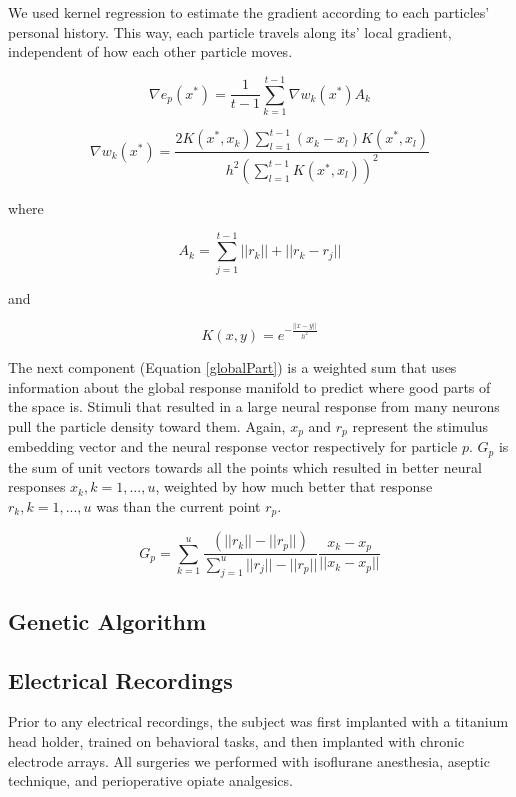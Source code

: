 We used kernel regression to estimate the gradient according to each particles’ personal history. This way, each particle travels along its' local gradient, independent of how each other particle moves. 

\begin{equation}
\nabla e_p (x^* )=\frac{1}{t-1} \sum_{k=1}^{t-1} \nabla w_k (x^* )  A_k
\end{equation}

\begin{equation}
\nabla w_k (x^* )=\frac{2K(x^*,x_k) \sum_{l=1}^{t-1} (x_k-x_l)K(x^*,x_l)} {h^2\left(\sum_{l=1}^{t-1}K(x^*, x_l)\right)^2}
\end{equation}

where

\begin{equation}
A_k = \sum_{j=1}^{t-1}||r_k||+||r_k-r_j||
\end{equation}

and

\begin{equation}
K(x,y)=e^{- \frac{||x-y||}{h^2}}
\end{equation}

The next component (Equation \ref{globalPart}) is a weighted sum that uses information about the global response manifold to predict where good parts of the space is. Stimuli that resulted in a large neural response from many neurons pull the particle density toward them. Again, $x_p$ and $r_p$ represent the stimulus embedding vector and the neural response vector respectively for particle $p$. $G_p$ is the sum of unit vectors towards all the points which resulted in better neural responses $x_k, k = 1,...,u$, weighted by how much better that response $r_k, k = 1,...,u$ was than the current point $r_p$.

\begin{equation}
G_p = \sum_{k=1}^{u}\frac{(||r_k||-||r_p||)}{\sum_{j=1}^{u}||r_j||-||r_p||} \frac {x_k-x_p}{||x_k-x_p||}
\label{globalPart}
\end{equation}

\subsection{Genetic Algorithm}



\subsection{Electrical Recordings}
Prior to any electrical recordings, the subject was first implanted with a titanium head holder, trained on behavioral tasks, and then implanted with chronic electrode arrays. All surgeries we performed with isoflurane anesthesia, aseptic technique, and perioperative opiate analgesics.

